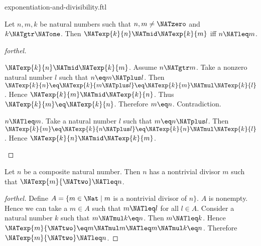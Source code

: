 \documentclass{naproche-library}
\begin{document}
\begin{smodule}[title=Exponentiation and Divisibility]{exponentiation-and-divisibility.ftl}

\begin{proposition}[forthel,id=ARITHMETIC_13_8426075493236736]
  Let $n, m, k$ be natural numbers such that $n, m \neq \NATzero$ and $k \NATgtr \NATone$.
  Then $\NATexp{k}{n} \NATmid \NATexp{k}{m}$ iff $n \NATleq m$.
\end{proposition}
\begin{proof}[forthel]
  \begin{case}{$\NATexp{k}{n} \NATmid \NATexp{k}{m}$.}
    Assume $n \NATgtr m$.
    Take a nonzero natural number $l$ such that $n \eq m \NATplus l$.
    Then $\NATexp{k}{n}
      \eq \NATexp{k}{m \NATplus l}
      \eq \NATexp{k}{m} \NATmul \NATexp{k}{l}$.
    Hence $\NATexp{k}{m} \NATmid \NATexp{k}{n}$.
    Thus $\NATexp{k}{m} \eq \NATexp{k}{n}$.
    Therefore $m \eq n$.
    Contradiction.
  \end{case}

  \begin{case}{$n \NATleq m$.}
    Take a natural number $l$ such that $m \eq n \NATplus l$.
    Then $\NATexp{k}{m}
      \eq \NATexp{k}{n \NATplus l}
      \eq \NATexp{k}{n} \NATmul \NATexp{k}{l}$.
    Hence $\NATexp{k}{n} \NATmid \NATexp{k}{m}$.
  \end{case}
\end{proof}

\begin{proposition}[forthel,id=ARITHMETIC_13_797196163219456]
  Let $n$ be a composite natural number.
  Then $n$ has a nontrivial divisor $m$ such that $\NATexp{m}{\NATtwo} \NATleq n$.
\end{proposition}
\begin{proof}[forthel]
  Define $A = \{ m \in \Nat \mid m$ is a nontrivial divisor of $n \}$.
  $A$ is nonempty.
  Hence we can take a $m \in A$ such that $m \NATleq l$ for all $l \in A$.
  Consider a natural number $k$ such that $m \NATmul k \eq n$.
  Then $m \NATleq k$.
  Hence $\NATexp{m}{\NATtwo} \eq m \NATmul m \NATleq m \NATmul k \eq n$.
  Therefore $\NATexp{m}{\NATtwo} \NATleq n$.
\end{proof}
\end{smodule}
\end{document}

